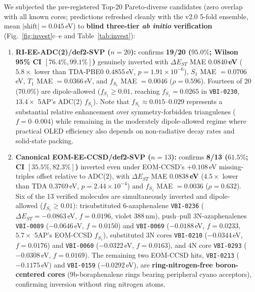 \documentclass[10pt,twocolumn]{article}
\theoremstyle{natthm}
\newcommand{\dEST}{\Delta E_{ST}}
\begin{document}
We subjected the pre-registered Top-20 Pareto-diverse candidates (zero overlap with all known cores; predictions refreshed cleanly with the v2.0 5-fold ensemble, mean $|\text{shift}|=0.045$\,eV) to \textbf{blind three-tier \emph{ab initio} verification} (Fig.~\ref{fig:invest}c--e and Table~\ref{tab:invest}):
\begin{enumerate}
  \setlength{\itemsep}{1pt}
  \item \textbf{RI-EE-ADC(2)/def2-SVP ($n=20$):} confirms \textbf{19/20 ($95.0\%$; Wilson\cite{wilson1927} 95\% CI $[76.4\%,99.1\%]$)} genuinely inverted with $\dEST$ MAE \textbf{$0.0840$\,eV} ($5.8\times$ lower than TDA-PBE0 $0.4855$\,eV, $p=1.91\times 10^{-6}$), $S_1$ MAE $=0.0706$\,eV, $T_1$ MAE $=0.0366$\,eV, and $f_{S_1}$ MAE $=0.0046$ ($\rho=0.596$). Fourteen of 20 ($70.0\%$) are dipole-allowed ($f_{S_1}\ge 0.01$, reaching $f_{S_1}=0.0265$ in \texttt{VBI-0230}, $13.4\times$ 5AP's ADC(2) $f_{S_1}$). Note that $f_{S_1}\approx 0.015$--$0.029$ represents a substantial relative enhancement over symmetry-forbidden triangulenes ($f=0$--$0.004$) while remaining in the moderately dipole-allowed regime where practical OLED efficiency also depends on non-radiative decay rates and solid-state packing.
  \item \textbf{Canonical EOM-EE-CCSD/def2-SVP ($n=13$):} confirms \textbf{8/13 ($61.5\%$; CI $[35.5\%,82.3\%]$)} inverted even under EOM-CCSD's $+0.108$\,eV missing-triples offset relative to ADC(2)\cite{loos2023invest,dreuw2023}, with $\dEST$ MAE \textbf{$0.0838$\,eV} ($4.5\times$ lower than TDA $0.3769$\,eV, $p=2.44\times 10^{-4}$) and $f_{S_1}$ MAE $=0.0036$ ($\rho=0.632$). Six of the 13 verified molecules are simultaneously inverted and dipole-allowed ($f_{S_1}\ge 0.01$): trisubstituted 6-azaphenalene \texttt{VBI-0236} ($\dEST=-0.0863$\,eV, $f=0.0196$, violet $388$\,nm), push--pull 3N-azaphenalenes \texttt{VBI-0089} ($-0.0646$\,eV, $f=0.0150$) and \texttt{VBI-0069} ($-0.0188$\,eV, $f=0.0233$, $5.7\times$ 5AP's EOM-CCSD $f_{S_1}$), substituted 3N cores \texttt{VBI-0210} ($-0.0344$\,eV, $f=0.0176$) and \texttt{VBI-0060} ($-0.0322$\,eV, $f=0.0163$), and 4N core \texttt{VBI-0293} ($-0.0308$\,eV, $f=0.0169$). The remaining two EOM-CCSD hits, \texttt{VBI-0213} ($-0.1175$\,eV) and \texttt{VBI-0159} ($-0.0292$\,eV), are \textbf{ring-nitrogen-free boron-centered cores} (9b-boraphenalene rings bearing peripheral cyano acceptors), confirming inversion without ring nitrogen atoms.

\end{enumerate}
\end{document}
